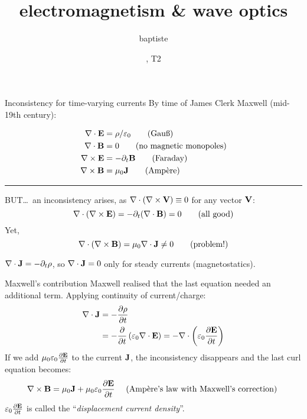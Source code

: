 \documentclass{article}
\title{electromagnetism \& wave optics}
\author{baptiste}
\date{\the\year, T2}
\begin{document}
\ifdefined\Shaded\renewenvironment{Shaded}{\begin{tcolorbox}[boxrule=0pt, borderline west={3pt}{0pt}{shadecolor}, frame hidden, enhanced, interior hidden, sharp corners, breakable]}{\end{tcolorbox}}\fi


\begin{frame}{Inconsistency for time-varying currents}
\protect\hypertarget{inconsistency-for-time-varying-currents}{}
By time of James Clerk Maxwell (mid-19th century):

\[\begin{aligned}
\nabla\cdot\mathbf{E}& =\rho / \varepsilon_0\qquad\text{(Gau\ss)}\\
\nabla\cdot\mathbf{B}&=0\qquad\text{(no magnetic monopoles)}\\
\nabla\times\mathbf{E}&=-\partial_t \mathbf{B}\qquad\text{(Faraday)}\\
\nabla\times\mathbf{B}&=\mu_0 \mathbf{J}\qquad\text{(Ampère)}
\end{aligned}
\]

\hrule

BUT\dots~an inconsistency arises, as \(\nabla\cdot(\nabla\times\mathbf{V})\equiv 0\) for
any vector \(\mathbf{V}\): \[
\nabla\cdot(\nabla\times\mathbf{E})=-\partial_t (\nabla\cdot\mathbf{B})=0 \qquad(\text{all good})
\] Yet, \[
\nabla\cdot(\nabla\times\mathbf{B})=\mu_0 \nabla\cdot\mathbf{J} \neq 0 \qquad(\text{problem!})
\]

\(\nabla\cdot\mathbf{J} = -\partial_t \rho\), so \(\nabla\cdot\mathbf{J} = 0\) only for steady
currents (magnetostatics).
\end{frame}

\begin{frame}{Maxwell's contribution}
\protect\hypertarget{maxwells-contribution}{}
Maxwell realised that the last equation needed an additional term.
Applying continuity of current/charge: \[
\begin{aligned}
\nabla\cdot\mathbf{J} &=-\frac{\partial \rho}{\partial t} \\
&=-\frac{\partial}{\partial t}\left(\varepsilon_0\nabla\cdot\mathbf{E}\right)=-\nabla\cdot\left(\varepsilon_0 \frac{\partial \mathbf{E}}{\partial t}\right)
\end{aligned}
\] If we add \(\mu_0 \varepsilon_0 \frac{\partial \mathbf{E}}{\partial t}\)
to the current \(\mathbf{J}\), the inconsistency disappears and the last curl
equation becomes: \[
\nabla\times\mathbf{B}=\mu_0 \mathbf{J}+\mu_0 \varepsilon_0 \frac{\partial \mathbf{E}}{\partial t} \quad \text { (Ampère's law with Maxwell's correction) }
\] \(\varepsilon_0 \frac{\partial \mathbf{E}}{\partial t}\) is called the
``\emph{displacement current density}''.
\end{frame}
\end{document}
